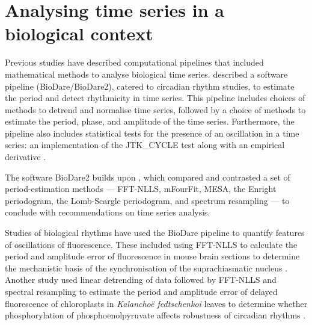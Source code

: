 \section{Analysing time series in a biological context}
\label{sec:analysis-literature}

Previous studies have described computational pipelines that included mathematical methods to analyse biological time series.
\textcite{zielinskiPeriodEstimationRhythm2022} described a software pipeline (BioDare/BioDare2), catered to circadian rhythm studies, to estimate the period and detect rhythmicity in time series.
This pipeline includes choices of methods to detrend and normalise time series, followed by a choice of methods to estimate the period, phase, and amplitude of the time series.
Furthermore, the pipeline also includes statistical tests for the presence of an oscillation in a time series: an implementation of the JTK\_CYCLE test \parencite{hughesJTK_CYCLEEfficientNonparametric2010} along with an empirical derivative \parencite{hutchisonImprovedStatisticalMethods2015}.

The software BioDare2 builds upon \textcite{zielinskiStrengthsLimitationsPeriod2014}, which compared and contrasted a set of period-estimation methods ---
FFT-NLLS, mFourFit, MESA, the Enright periodogram, the Lomb-Scargle periodogram, and spectrum resampling --- to conclude with recommendations on time series analysis.

Studies of biological rhythms have used the BioDare pipeline to quantify features of oscillations of fluorescence.
These included using FFT-NLLS to calculate the period and amplitude error of fluorescence in mouse brain sections to determine the mechanistic basis of the synchronisation of the suprachiasmatic nucleus \parencite{hamnettVasoactiveIntestinalPeptide2019}.
Another study used linear detrending of data followed by FFT-NLLS and spectral resampling to estimate the period and amplitude error of delayed fluorescence of chloroplasts in \textit{Kalancho\"{e} fedtschenkoi} leaves to determine whether phosphorylation of phosphoenolpyruvate affects robustness of circadian rhythms \parencite{boxallPhosphorylationPhosphoenolpyruvateCarboxylase2017}.

